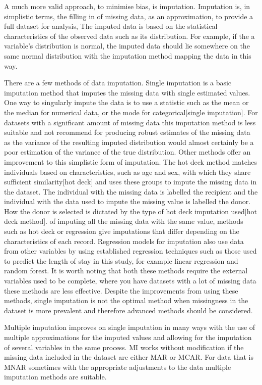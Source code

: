 \documentclass[11pt]{article}
\begin{document}
A much more valid approach, to minimise bias, is imputation. Imputation is, in simplistic terms, the filling in of missing data, as an approximation, to provide a full dataset for analysis, The imputed data is based on the statistical characteristics of the observed data such as its distribution. For example, if the a variable's distribution is normal, the imputed data should lie somewhere on the same normal distribution with the imputation method mapping the data in this way. 

There are a few methods of data imputation. Single imputation is a basic imputation method that imputes the missing data with single estimated values. One way to singularly impute the data is to use a statistic such as the mean or the median for numerical data, or the mode for categorical[single imputation]. For datasets with a significant amount of missing data this imputation method is less suitable and not recommend for producing robust estimates of the missing data as the variance of the resulting imputed distribution would almost certainly be a poor estimation of the variance of the true distribution. Other methods offer an improvement to this simplistic form of imputation. The hot deck method matches individuals based on characteristics, such as age and sex, with which they share sufficient similarity[hot deck] and uses these groups to impute the missing data in the dataset. The individual with the missing data is labelled the recipient and the individual with the data used to impute the missing value is labelled the donor. How the donor is selected is dictated by the type of hot deck imputation used[hot deck method]. of imputing all the missing data with the same value, methods such as hot deck or regression give imputations that differ depending on the characteristics of each record. Regression models for imputation also use data from other variables by using established regression techniques such as those used to predict the length of stay in this study, for example linear regression and random forest. It is worth noting that both these methods require the external variables used to be complete, where you have datasets with a lot of missing data these methods are less effective. Despite the improvements from using these methods, single imputation is not the optimal method when missingness in the dataset is more prevalent and therefore advanced methods should be considered.

Multiple imputation improves on single imputation in many ways with the use of multiple approximations for the imputed values and allowing for the imputation of several variables in the same process. MI works without modification if the missing data included in the dataset are either MAR or MCAR. For data that is MNAR sometimes with the appropriate adjustments to the data multiple imputation methods are suitable. 
\end{document}
